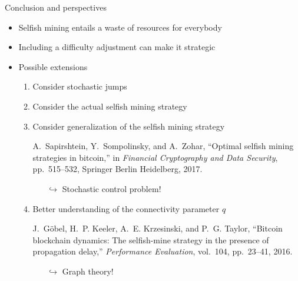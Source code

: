 \documentclass{beamer}
\begin{document}
\begin{frame}{Conclusion and perspectives}
\begin{itemize}
  \item Selfish mining entails a waste of resources for everybody
  \item Including a difficulty adjustment can make it strategic
  \item Possible extensions
  \begin{enumerate}
  \item Consider stochastic jumps
  \item Consider the actual selfish mining strategy
  \item Consider generalization of the selfish mining strategy
  \tiny 
  \begin{thebibliography}{1}

A.~Sapirshtein, Y.~Sompolinsky, and A.~Zohar, ``Optimal selfish mining
  strategies in bitcoin,'' in {\em Financial Cryptography and Data Security},
  pp.~515--532, Springer Berlin Heidelberg, 2017.

\end{thebibliography}
\begin{itemize}
  \item[$\hookrightarrow$] Stochastic control problem!
\end{itemize}
\item \small Better understanding of the connectivity parameter $q$
\tiny 
\begin{thebibliography}{1}

J.~G{\"o}bel, H.~P. Keeler, A.~E. Krzesinski, and P.~G. Taylor, ``Bitcoin
  blockchain dynamics: The selfish-mine strategy in the presence of propagation
  delay,'' {\em Performance Evaluation}, vol.~104, pp.~23--41, 2016.

\end{thebibliography}
\begin{itemize}
  \item[$\hookrightarrow$] Graph theory!
\end{itemize}
\end{enumerate}
\end{itemize}
\end{frame}
\end{document}

